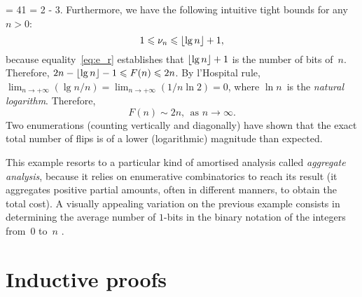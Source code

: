 = 41 = 2  - 3\). Furthermore, we have the following intuitive
tight bounds for any \(n>0\):
\begin{equation*}
1 \leqslant \nu_{n} \leqslant \lfloor{\lg n}\rfloor + 1,
\end{equation*}
because equality~\eqref{eq:e_r} establishes that \(\lfloor{\lg n}\rfloor + 1\)
is the number of bits of~\(n\). Therefore, \(2n - \lfloor{\lg n}\rfloor - 1
\leqslant F(n) \leqslant 2n\). By l'Hospital rule, \(\lim_{n \to
  +\infty}{(\lg n/n)} = \lim_{n \to +\infty}(1/n\ln 2) = 0\), where
\(\ln n\)~is the \emph{natural logarithm}. Therefore,
\begin{equation*}
F(n) \sim 2n,\;\, \text{as \(n \rightarrow \infty\)}.
\end{equation*}
Two enumerations (counting vertically and diagonally) have shown that
the exact total number of flips is of a lower (logarithmic) magnitude
than expected.

This example resorts to a particular kind of amortised analysis called
\emph{aggregate analysis}, because it relies on enumerative
combinatorics \citep{Stanley_1999a,Stanley_1999b,Martin_2001} to reach
its result (it aggregates positive partial amounts, often in different
manners, to obtain the total cost). A visually appealing variation on
the previous example consists in determining the average number of
\(1\)-bits in the binary notation of the integers from~\(0\) to~\(n\)
\citep{Bush_1940}.

\section{Inductive proofs}

